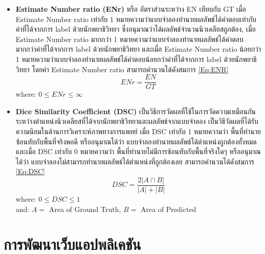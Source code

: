 \documentclass[12pt,oneside,openright,a4paper]{cpe-thai-project}
\begin{document}
\begin{itemize}
\item \textbf{Estimate Number ratio (ENr)} หรือ อัตราส่วนระหว่าง EN เทียบกับ GT เมื่อ Estimate Number ratio เท่ากับ 1 หมายความว่าแบบจำลองทำนายผลลัพธ์ได้คำตอบเท่ากับค่าที่ได้จากการ label ด้วยนักพยาธิวิทยา ซึ่งอนุมาณว่าได้ผลลัพธ์จำนวนนิวเคลียสถูกต้อง, เมื่อ Estimate Number ratio มากกว่า 1 หมายความว่าแบบจำลองทำนายผลลัพธ์ได้คำตอบมากกว่าค่าที่ได้จากการ label ด้วยนักพยาธิวิทยา และเมื่อ Estimate Number ratio น้อยกว่า 1 หมายความว่าแบบจำลองทำนายผลลัพธ์ได้คำตอบน้อยกว่าค่าที่ได้จากการ label ด้วยนักพยาธิวิทยา โดยค่า Estimate Number ratio สามารถคำนวนได้ดังสมการ \ref{Eq:ENR}
    \begin{equation}
        ENr = \frac{EN}{GT} \label{Eq:ENR}
    \end{equation}
    where:  $0 \leq ENr \leq \infty$
    
\item \textbf{Dice Similarity Coefficient (DSC)} เป็นวิธีการวัดผลที่ใช้ในการวัดความเหมือนกันระหว่างตำแหน่งนิวเคลียสที่ได้จากนักพยาธิวิทยาและผลลัพธ์จากแบบจำลอง เป็นวิธีวัดผลที่ได้รับความนิยมในด้านการวิเคราะห์ภาพทางการแพทย์ \cite{DSC} เมื่อ DSC เท่ากับ 1 หมายความว่า พื้นที่ทำนายซ้อนทับกับพื้นที่จริงพอดี หรืออนุมาณได้ว่า แบบจำลองทำนายผลลัพธ์ได้ตำแหน่งถูกต้องทั้งหมด และเมื่อ DSC เท่ากับ 0 หมายความว่า พื้นที่ทำนายไม่มีการซ้อนทับกับพื้นที่จริงใดๆ หรืออนุมาณได้ว่า แบบจำลองไม่สามารถทำนายผลลัพธ์ได้ตำแหน่งที่ถูกต้องเลย สามารถคำนวนได้ดังสมการ \ref{Eq:DSC}
    \begin{equation}
        DSC = \frac{2 |A \cap B|}{|A| + |B|} \label{Eq:DSC}
    \end{equation}
    where: $0 \leq DSC \leq 1$ \\
    and: $A =$ Area of Ground Truth, $B =$ Area of Predicted

    
\end{itemize}
\section{การพัฒนาเว็บแอปพลิเคชัน}
\end{document}
